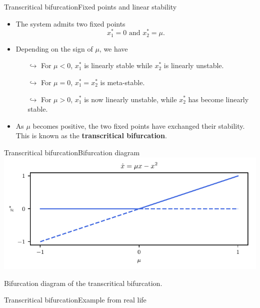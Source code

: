 \documentclass[usenames,dvipsnames,svgnames,10pt,aspectratio=169]{beamer}
\begin{document}
\begin{frame}[t, c]{Transcritical bifurcation}{Fixed points and linear stability}
	\begin{itemize}
		\item The system admits two fixed points
		$$x_1^ * = 0 \text{ and } x_2^* = \mu.$$

		\item Depending on the sign of $\mu$, we have
		\begin{itemize}
			\item[$\hookrightarrow$] For $\mu < 0$, $x_1^*$ is linearly stable while $x_2^*$ is linearly unstable.
			\item[$\hookrightarrow$] For $\mu=0$, $x_1^* = x_2^*$ is meta-stable.
			\item[$\hookrightarrow$] For $\mu > 0$, $x_1^*$ is now linearly unstable, while $x_2^*$ has become linearly stable.
		\end{itemize}

		\medskip

		\item As $\mu$ becomes positive, the two fixed points have exchanged their stability. This is known as the \alert{\textbf{transcritical bifurcation}}.
	\end{itemize}

	\vspace{1cm}
\end{frame}

\begin{frame}[t, c]{Transcritical bifurcation}{Bifurcation diagram}
	\centering
	\includegraphics[width=.75\textwidth]{transcritical_bifurcation_diagram}

	Bifurcation diagram of the transcritical bifurcation.
	\vspace{1cm}
\end{frame}

\begin{frame}[t, c]{Transcritical bifurcation}{Example from real life}

\end{frame}
\end{document}
